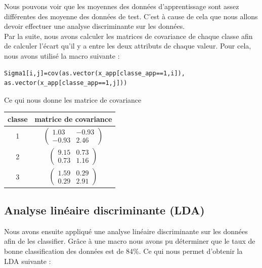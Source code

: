 \documentclass[a4paper,11pt]{article}
\begin{document}
  Nous pouvons voir que les moyennes des données d'apprentissage sont assez différentes des moyenne
  des données de test. C'est à cause de cela que nous allons devoir effectuer une analyse discriminante
  sur les données.\\
  
  Par la suite, nous avons calculer les matrices de covariance de chaque classe afin de calculer l'écart
  qu'il y a entre les deux attributs de chaque valeur. Pour cela, nous avons utilisé la macro suivante :
  
  \begin{lstlisting}[caption=Calcul de covariance de la classe d'apprentissage 1]
  Sigma1[i,j]=cov(as.vector(x_app[classe_app==1,i]), as.vector(x_app[classe_app==1,j]))
  \end{lstlisting}
  
  Ce qui nous donne les matrice de covariance
  \begin{center}
    \begin{tabular}{|c|c|}
    \hline
    classe & matrice de covariance\\
    \hline
    1 & 
    $\begin{pmatrix}
     1.03 & -0.93\\
     -0.93 & 2.46
    \end{pmatrix}$\\
    \hline
    2 & 
    $\begin{pmatrix}
     9.15 & 0.73\\
     0.73 & 1.16
    \end{pmatrix}$\\
    \hline
    3 & 
    $\begin{pmatrix}
     1.59 & 0.29\\
     0.29 & 2.91
    \end{pmatrix}$\\
    \hline
    \end{tabular}
  \end{center}
  
  \subsection{Analyse linéaire discriminante (LDA)}
  
  Nous avons ensuite appliqué une analyse linéaire discriminante sur les données afin de les 
  classifier. Grâce à une macro nous avons pu déterminer que le taux de
  bonne classification des données est de 84\%. Ce qui nous permet d'obtenir la LDA suivante :\\
  
\end{document}
